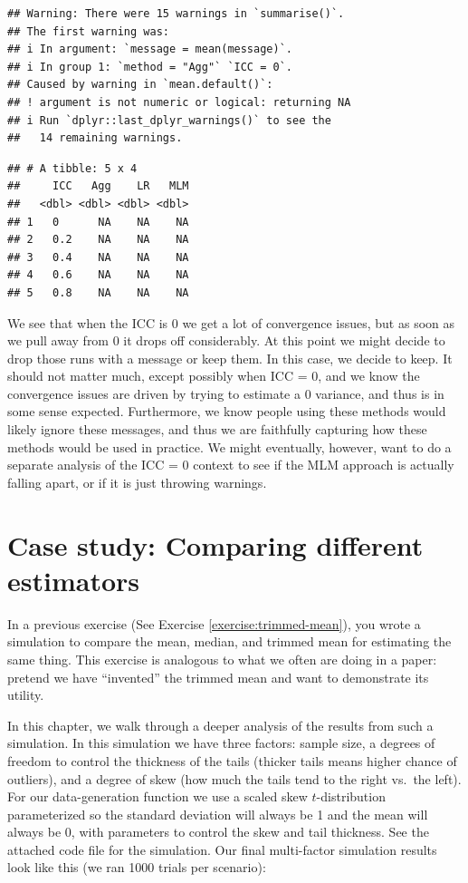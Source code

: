\documentclass[
]{book}
\begin{document}
\begin{verbatim}
## Warning: There were 15 warnings in `summarise()`.
## The first warning was:
## i In argument: `message = mean(message)`.
## i In group 1: `method = "Agg"` `ICC = 0`.
## Caused by warning in `mean.default()`:
## ! argument is not numeric or logical: returning NA
## i Run `dplyr::last_dplyr_warnings()` to see the
##   14 remaining warnings.
\end{verbatim}

\begin{verbatim}
## # A tibble: 5 x 4
##     ICC   Agg    LR   MLM
##   <dbl> <dbl> <dbl> <dbl>
## 1   0      NA    NA    NA
## 2   0.2    NA    NA    NA
## 3   0.4    NA    NA    NA
## 4   0.6    NA    NA    NA
## 5   0.8    NA    NA    NA
\end{verbatim}

We see that when the ICC is 0 we get a lot of convergence issues, but as soon as we pull away from 0 it drops off considerably.
At this point we might decide to drop those runs with a message or keep them.
In this case, we decide to keep.
It should not matter much, except possibly when ICC = 0, and we know the convergence issues are driven by trying to estimate a 0 variance, and thus is in some sense expected.
Furthermore, we know people using these methods would likely ignore these messages, and thus we are faithfully capturing how these methods would be used in practice.
We might eventually, however, want to do a separate analysis of the ICC = 0 context to see if the MLM approach is actually falling apart, or if it is just throwing warnings.

\chapter{Case study: Comparing different estimators}\label{case-study-comparing-different-estimators}

In a previous exercise (See Exercise \ref{exercise:trimmed-mean}), you wrote a simulation to compare the mean, median, and trimmed mean for estimating the same thing.
This exercise is analogous to what we often are doing in a paper: pretend we have ``invented'' the trimmed mean and want to demonstrate its utility.

In this chapter, we walk through a deeper analysis of the results from such a simulation.
In this simulation we have three factors: sample size, a degrees of freedom to control the thickness of the tails (thicker tails means higher chance of outliers), and a degree of skew (how much the tails tend to the right vs.~the left).
For our data-generation function we use a scaled skew \(t\)-distribution parameterized so the standard deviation will always be 1 and the mean will always be 0, with parameters to control the skew and tail thickness.
See the attached code file for the simulation.
Our final multi-factor simulation results look like this (we ran 1000 trials per scenario):
\end{document}
